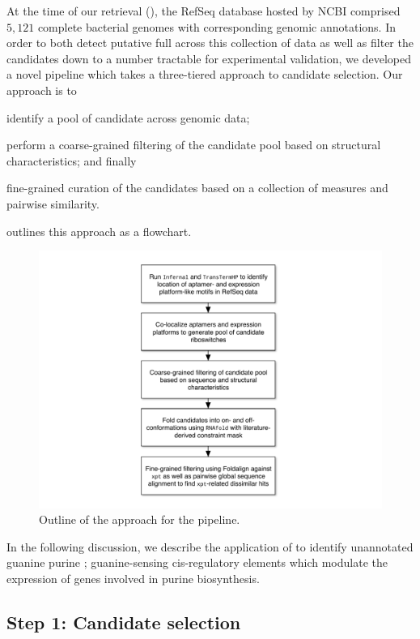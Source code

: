 At the time of our retrieval (\fnaRetrievalTime), the RefSeq database hosted by
NCBI comprised $5,121$ complete bacterial genomes with corresponding genomic
annotations. In order to both detect putative full \rbs across this
collection of data as well as filter the candidates down to a number tractable for
experimental validation, we developed a novel pipeline which takes a three-tiered
approach to candidate selection. Our approach is to
\begin{inparaenum}[\em 1\upshape)]
\item identify a pool of candidate \rbs across genomic data;
\item perform a coarse-grained filtering of the candidate pool based on structural
characteristics; and finally
\item fine-grained curation of the candidates based on a collection of measures
and pairwise similarity.
\end{inparaenum}  outlines this approach as a
flowchart.

\begin{figure}[!ht]
\centering
\includegraphics[width=.9\textwidth]{Figures/Ribofinder/ribofinderOverview.pdf}
\caption[Outline of the approach for the \rfinder pipeline]
{Outline of the approach for the \rfinder pipeline.}
\label{fig:rfinder:flowchart}
\end{figure}

In the following discussion, we describe the application of \rfinder to identify
unannotated guanine purine \rbs; guanine-sensing cis-regulatory elements
which modulate the expression of genes involved in purine biosynthesis.

\subsection{Step 1: Candidate selection}
\label{subsec:rfinder:selection}

